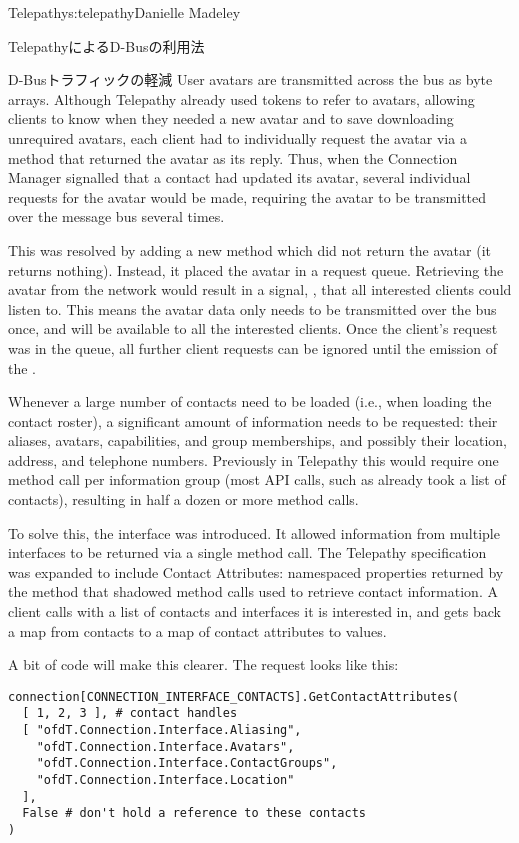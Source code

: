 \begin{aosachapter}{Telepathy}{s:telepathy}{Danielle Madeley}
\begin{aosasect1}{TelepathyによるD-Busの利用法}
\begin{aosasect2}{D-Busトラフィックの軽減}
User avatars are transmitted across the bus as byte arrays. Although
Telepathy already used tokens to refer to avatars, allowing clients to
know when they needed a new avatar and to save downloading unrequired
avatars, each client had to individually request the avatar via a
 method that returned the avatar as its reply.
Thus, when the Connection Manager signalled that a contact had updated
its avatar, several individual requests for the avatar would be made,
requiring the avatar to be transmitted over the message bus several
times.

This was resolved by adding a new method which did not return the
avatar (it returns nothing). Instead, it placed the avatar in a
request queue.  Retrieving the avatar from the network would result in
a signal, , that all interested clients could
listen to. This means the avatar data only needs to be transmitted
over the bus once, and will be available to all the interested
clients. Once the client's request was in the queue, all further
client requests can be ignored until the emission of the
.

Whenever a large number of contacts need to be loaded (i.e., when
loading the contact roster), a significant amount of information needs
to be requested: their aliases, avatars, capabilities, and group
memberships, and possibly their location, address, and telephone numbers.
Previously in Telepathy this would require one method call per
information group (most API calls, such as  already
took a list of contacts), resulting in half a dozen or more method calls.

To solve this, the  interface was introduced.  It
allowed information from multiple interfaces to be returned via a
single method call. The Telepathy specification was expanded to
include Contact Attributes: namespaced properties returned by the
 method that shadowed method calls used to
retrieve contact information. A client calls
 with a list of contacts and interfaces it
is interested in, and gets back a map from contacts to a map of
contact attributes to values.

A bit of code will make this clearer.  The request looks like this:

\begin{verbatim}
connection[CONNECTION_INTERFACE_CONTACTS].GetContactAttributes(
  [ 1, 2, 3 ], # contact handles
  [ "ofdT.Connection.Interface.Aliasing",
    "ofdT.Connection.Interface.Avatars",
    "ofdT.Connection.Interface.ContactGroups",
    "ofdT.Connection.Interface.Location"
  ],
  False # don't hold a reference to these contacts
)
\end{verbatim}


\end{aosasect2}
\end{aosasect1}
\end{aosachapter}
